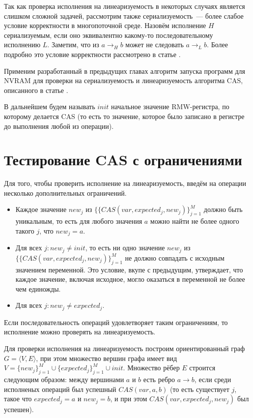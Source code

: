\documentclass[times,specification,annotation]{itmo-student-thesis}
\begin{document}
Так как проверка исполнения на линеаризуемость в некоторых случаях является слишком сложной задачей, рассмотрим также сериализуемость~--- более слабое условие корректности в многопоточной среде. Назовём исполнение $H$ сериализуемым, если оно эквивалентно какому-то последовательному исполнению $L$. Заметим, что из $a \rightarrow_H b$ может не следовать $a \rightarrow_L b$. Более подробно это условие корректности рассмотрено в статье \cite{papadimitriou1979serializability}. 

Применим разработанный в предыдущих главах алгоритм запуска программ для NVRAM для проверки на сериализуемость и линеаризуемость алгоритма CAS, описанного в статье \cite{attiya2018nesting}. 

В дальнейшем будем называть $init$ начальное значение RMW-регистра, по которому делается CAS (то есть то значение, которое было записано в регистре до выполнения любой из операции).

\section{Тестирование CAS с ограничениями}
\label{restricted-cas-checking}
Для того, чтобы проверить исполнение на линеаризуемость, введём на операции несколько дополнительных ограничений.

\begin{itemize}
    \item Каждое значение $new_j$ из $\{\{CAS(var, expected_j, new_j)\}_{j = 1}^{M}$ должно быть уникальным, то есть для любого значения $a$ можно найти не более одного такого $j$, что $new_j = a$.
    
    \item Для всех $j: new_j \ne init$, то есть ни одно значение $new_j$ из $\{\{CAS(var, expected_j, new_j)\}_{j = 1}^{M}$ не должно совпадать с исходным значением переменной. Это условие, вкупе с предыдущим, утверждает, что каждое значение, включая исходное, могло оказаться в переменной не более чем единожды.
    
    \item  Для всех $j: new_j \ne expected_j$.
\end{itemize}

\bigbreak

Если последовательность операций удовлетворяет таким ограничениям, то исполнение можно проверять на линеаризуемость.

Для проверки исполнения на линеаризуемость построим ориентированный граф $G = \langle V, E \rangle$, при этом множество вершин графа имеет вид $V = \{new_j\}_{j = 1}^M \cup \{expected_j\}_{j = 1}^M \cup init$. Множество рёбер $E$ строится следующим образом: между вершинами $a$ и $b$ есть ребро $a \rightarrow b$, если среди исполненых операций был успешный $CAS(var, a, b)$ (то есть существует $j$, такое что $expected_j = a$ и $new_j = b$, и при этом $CAS(var, expected_j, new_j)$ был успешен).
\end{document}
